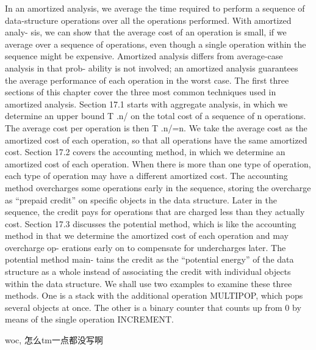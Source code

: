 \documentclass[a4paper, 10pt]{ctexbook} %
\begin{document}
\tableofcontents
In an amortized analysis, we average the time required to perform a sequence of data-structure operations over all the operations performed. With amortized analy- sis, we can show that the average cost of an operation is small, if we average over a sequence of operations, even though a single operation within the sequence might be expensive. Amortized analysis differs from average-case analysis in that prob- ability is not involved; an amortized analysis guarantees the average performance of each operation in the worst case.  The first three sections of this chapter cover the three most common techniques used in amortized analysis. Section 17.1 starts with aggregate analysis, in which we determine an upper bound T .n/ on the total cost of a sequence of n operations.  The average cost per operation is then T .n/=n. We take the average cost as the amortized cost of each operation, so that all operations have the same amortized cost.  Section 17.2 covers the accounting method, in which we determine an amortized cost of each operation. When there is more than one type of operation, each type of operation may have a different amortized cost. The accounting method overcharges some operations early in the sequence, storing the overcharge as “prepaid credit” on specific objects in the data structure. Later in the sequence, the credit pays for operations that are charged less than they actually cost.  Section 17.3 discusses the potential method, which is like the accounting method in that we determine the amortized cost of each operation and may overcharge op- erations early on to compensate for undercharges later. The potential method main- tains the credit as the “potential energy” of the data structure as a whole instead of associating the credit with individual objects within the data structure.  We shall use two examples to examine these three methods. One is a stack with the additional operation MULTIPOP, which pops several objects at once. The other is a binary counter that counts up from 0 by means of the single operation INCREMENT.  

woc, 怎么tm一点都没写啊
\end{document}
